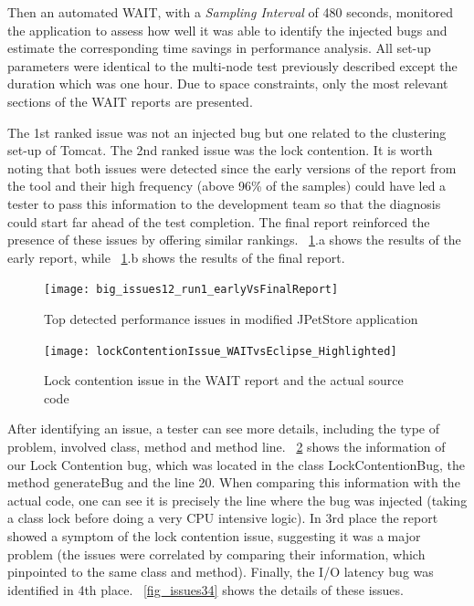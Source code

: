 \documentclass[runningheads,a4paper]{llncs}
\begin{document}
Then an automated WAIT, with a \emph{Sampling Interval} of 480 seconds,
monitored the application to assess how well it was able to identify the
injected bugs and estimate the corresponding time savings in performance
analysis. All set-up parameters were identical to the multi-node test previously 
described except the duration which was one hour. Due to space
constraints, only the most relevant sections of the WAIT reports are presented.

The 1st ranked issue was not an injected bug but one related to the
clustering set-up of Tomcat.
The 2nd ranked issue was the lock
contention. It is worth noting that both issues were
detected since the early versions of the report from the tool and their
high frequency (above 96\% of the samples) could have led a tester to pass this
information to the development team so that the diagnosis could start far ahead
of the test completion. The final report reinforced the presence of these issues 
by offering similar rankings. \figurename ~\ref{fig_run1_bugs12}.a shows the
results of the early report, while ~\ref{fig_run1_bugs12}.b shows the results of 
the final report.

\begin{figure}[!h]
\centering
\texttt{[image: big\_issues12\_run1\_earlyVsFinalReport]}
\caption{Top detected performance issues in modified JPetStore application}
\label{fig_run1_bugs12}
\end{figure}

\begin{figure}[!h]
\centering
\texttt{[image: lockContentionIssue\_WAITvsEclipse\_Highlighted]}
\caption{Lock contention issue in the WAIT report and the actual source code}
\label{fig_issue2_vs_code}
\end{figure}

After identifying an issue, a tester can see more details, including the type of
problem, involved class, method and method line. \figurename
~\ref{fig_issue2_vs_code} shows the information of our Lock Contention bug,
which was located in the class LockContentionBug, the method generateBug and the
line 20. When comparing this information with the actual code, one can see it
is precisely the line where the bug was injected (taking a class lock before
doing a very CPU intensive logic). In 3rd place the report showed a symptom of
the lock contention issue, suggesting it was a major problem (the issues were
correlated by comparing their information, which pinpointed to the same class and
method). Finally, the I/O latency bug was identified in 4th place. \figurename
~\ref{fig_issues34} shows the details of these issues.
\end{document}
